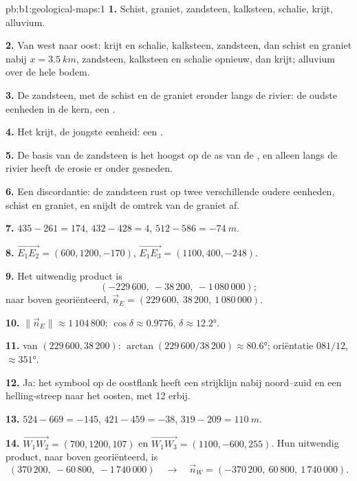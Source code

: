 \begin{solution}{pb:b1:geological-maps:1}
\textbf{1.} Schist, graniet, zandsteen, kalksteen, schalie, krijt, alluvium.

\textbf{2.} Van west naar oost: krijt en schalie, kalksteen, zandsteen, dan schist en graniet nabij
$x = \qty{3.5}{km}$, zandsteen, kalksteen en schalie opnieuw, dan krijt; alluvium over de hele bodem.

\textbf{3.} De zandsteen, met de schist en de graniet eronder langs de rivier: de oudste eenheden in
de kern, een .

\textbf{4.} Het krijt, de jongste eenheid: een .

\textbf{5.} De basis van de zandsteen is het hoogst op de as van de , en alleen langs de rivier
heeft de erosie er onder gesneden.

\textbf{6.} Een discordantie: de zandsteen rust op twee verschillende oudere eenheden, schist en graniet, en
snijdt de omtrek van de graniet af.

\textbf{7.} $435 - 261 = 174$, $432 - 428 = 4$, $512 - 586 = \qty{-74}{m}$.

\textbf{8.} $\overrightarrow{E_1E_2} = (600, 1200, -170)$,
$\overrightarrow{E_1E_3} = (1100, 400, -248)$.

\textbf{9.} Het uitwendig product is
\[
  (-229\,600,\ -38\,200,\ -1\,080\,000);
\]
naar boven georiënteerd, $\vec n_E = (229\,600,\ 38\,200,\ 1\,080\,000)$.

\textbf{10.} $\|\vec n_E\| \approx 1\,104\,800$; $\cos\delta \approx 0.9776$,
$\delta \approx \ang{12.2}$.

\textbf{11.}  van $(229\,600, 38\,200)$: $\arctan(229\,600/38\,200)
\approx \ang{80.6}$; oriëntatie $081/12$,  $\approx \ang{351}$.

\textbf{12.} Ja: het symbool op de oostflank heeft een strijklijn nabij
noord--zuid en een helling-streep naar het oosten, met 12 erbij.

\textbf{13.} $524 - 669 = -145$, $421 - 459 = -38$, $319 - 209 =
\qty{110}{m}$.

\textbf{14.} $\overrightarrow{W_1W_2} = (700, 1200, 107)$ en
$\overrightarrow{W_1W_3} = (1100, -600, 255)$. Hun uitwendig product, naar boven
georiënteerd, is
\[
  (370\,200,\ -60\,800,\ -1\,740\,000) \quad\longrightarrow\quad
  \vec n_W = (-370\,200,\ 60\,800,\ 1\,740\,000).
\]


\end{solution}
